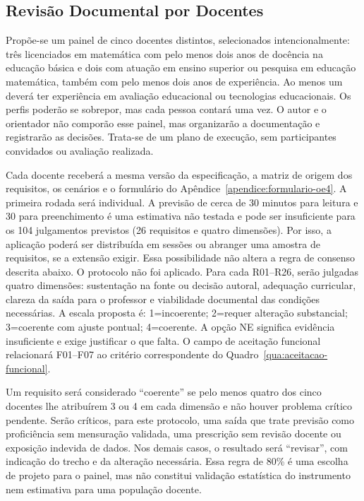 \subsection{Revisão Documental por Docentes}
\label{sec:revisao-docente-operacional}

Propõe-se um painel de cinco docentes distintos, selecionados intencionalmente: três licenciados em matemática com pelo menos dois anos de docência na educação básica e dois com atuação em ensino superior ou pesquisa em educação matemática, também com pelo menos dois anos de experiência. Ao menos um deverá ter experiência em avaliação educacional ou tecnologias educacionais. Os perfis poderão se sobrepor, mas cada pessoa contará uma vez. O autor e o orientador não comporão esse painel, mas organizarão a documentação e registrarão as decisões. Trata-se de um plano de execução, sem participantes convidados ou avaliação realizada.

Cada docente receberá a mesma versão da especificação, a matriz de origem dos requisitos, os cenários e o formulário do Apêndice~\ref{apendice:formulario-oe4}. A primeira rodada será individual. A previsão de cerca de 30 minutos para leitura e 30 para preenchimento é uma estimativa não testada e pode ser insuficiente para os 104 julgamentos previstos (26 requisitos e quatro dimensões). Por isso, a aplicação poderá ser distribuída em sessões ou abranger uma amostra de requisitos, se a extensão exigir. Essa possibilidade não altera a regra de consenso descrita abaixo. O protocolo não foi aplicado. Para cada R01--R26, serão julgadas quatro dimensões: sustentação na fonte ou decisão autoral, adequação curricular, clareza da saída para o professor e viabilidade documental das condições necessárias. A escala proposta é: 1=incoerente; 2=requer alteração substancial; 3=coerente com ajuste pontual; 4=coerente. A opção NE significa evidência insuficiente e exige justificar o que falta. O campo de aceitação funcional relacionará F01--F07 ao critério correspondente do Quadro~\ref{qua:aceitacao-funcional}.

Um requisito será considerado ``coerente'' se pelo menos quatro dos cinco docentes lhe atribuírem 3 ou 4 em cada dimensão e não houver problema crítico pendente. Serão críticos, para este protocolo, uma saída que trate previsão como proficiência sem mensuração validada, uma prescrição sem revisão docente ou exposição indevida de dados. Nos demais casos, o resultado será ``revisar'', com indicação do trecho e da alteração necessária. Essa regra de 80\% é uma escolha de projeto para o painel, mas não constitui validação estatística do instrumento nem estimativa para uma população docente.

